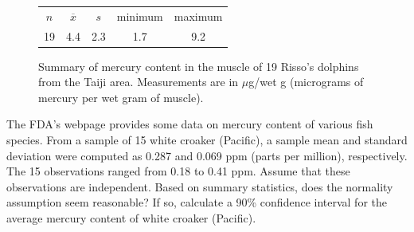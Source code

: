 \begin{figure}[h]
	\centering
	\begin{tabular}{ccc cc}
		\hline
		$n$ & $\overline{x}$ & $s$ & minimum & maximum \\
		19   & 4.4	  & 2.3  & 1.7	       & 9.2 \\
		\hline
	\end{tabular}
	\caption{Summary of mercury content in the muscle of 19 Risso's dolphins from the Taiji area. Measurements are in $\mu$g/wet g (micrograms of mercury per wet gram of muscle).}
	\label{summaryStatsOfHgInMuscleOfRissosDolphins}
\end{figure}		
		

\textD{\newpage}

\begin{exercisewrap}
\begin{nexercise}\label{croakerWhiteFishPacificExerConditions}%
%
The FDA's webpage provides some data on mercury content of various fish species.\footnotemark{} From a sample of 15 white croaker (Pacific), a sample mean and standard deviation were computed as 0.287 and 0.069 ppm (parts per million), respectively. The 15 observations ranged from 0.18 to 0.41 ppm. Assume that these observations are independent. Based on summary statistics, does the normality assumption seem reasonable? If so, calculate a 90\% confidence interval for the average mercury content of white croaker (Pacific).\footnotemark{}
\end{nexercise}
\end{exercisewrap}
\addtocounter{footnote}{-1}%
%
\addtocounter{footnote}{1}%

